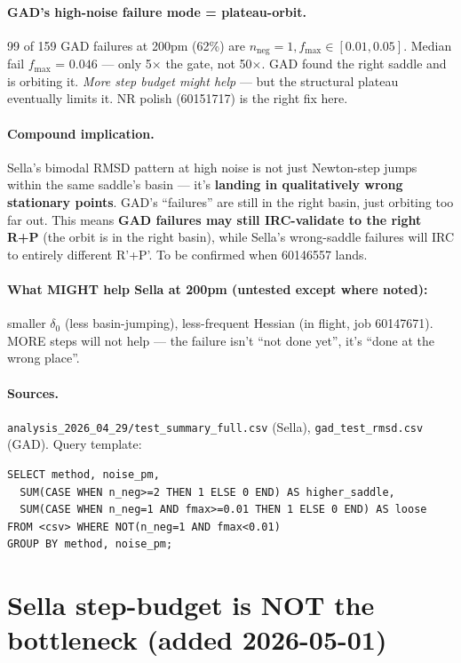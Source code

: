 \documentclass[11pt]{article}
\begin{document}
\paragraph{GAD's high-noise failure mode = plateau-orbit.} 99 of 159
GAD failures at 200pm (62\%) are $n_{\text{neg}}=1, f_{\max}\in[0.01, 0.05]$.
Median fail $f_{\max}$ = $0.046$ — only 5$\times$ the gate, not 50$\times$.
GAD found the right saddle and is orbiting it. \emph{More step budget
might help} — but the structural plateau eventually limits it. NR polish
(60151717) is the right fix here.

\paragraph{Compound implication.} Sella's bimodal RMSD pattern at high
noise is not just Newton-step jumps within the same saddle's basin —
it's \textbf{landing in qualitatively wrong stationary points}. GAD's
``failures'' are still in the right basin, just orbiting too far out.
This means \textbf{GAD failures may still IRC-validate to the right
R+P} (the orbit is in the right basin), while Sella's wrong-saddle
failures will IRC to entirely different R'+P'. To be confirmed when
60146557 lands.

\paragraph{What MIGHT help Sella at 200pm (untested except where noted):}
smaller $\delta_0$ (less basin-jumping), less-frequent Hessian (in flight,
job 60147671). MORE steps will not help — the failure isn't ``not done
yet'', it's ``done at the wrong place''.

\paragraph{Sources.}
\texttt{analysis\_2026\_04\_29/test\_summary\_full.csv} (Sella),
\texttt{gad\_test\_rmsd.csv} (GAD).
Query template:
\begin{verbatim}
SELECT method, noise_pm,
  SUM(CASE WHEN n_neg>=2 THEN 1 ELSE 0 END) AS higher_saddle,
  SUM(CASE WHEN n_neg=1 AND fmax>=0.01 THEN 1 ELSE 0 END) AS loose
FROM <csv> WHERE NOT(n_neg=1 AND fmax<0.01)
GROUP BY method, noise_pm;
\end{verbatim}

\section{Sella step-budget is NOT the bottleneck (added 2026-05-01)}
\end{document}
